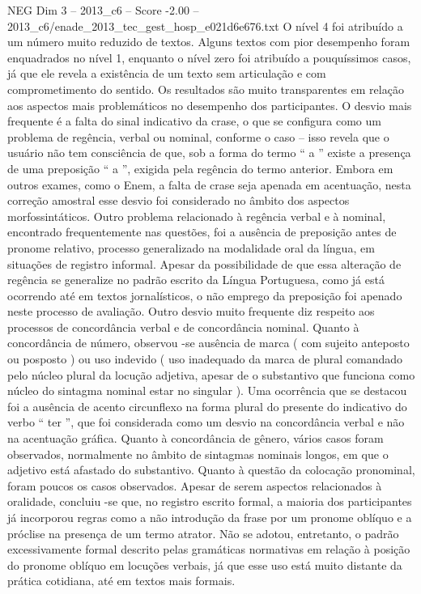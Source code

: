 \begin{textsample}{NEG Dim 3 – 2013\_c6 – Score -2.00 – 2013\_c6/enade\_2013\_tec\_gest\_hosp\_e021d6e676.txt}
O nível 4 foi atribuído a um número muito reduzido de textos.
Alguns textos com pior desempenho foram enquadrados no nível 1, enquanto o nível zero foi atribuído a pouquíssimos casos, já que ele revela a existência de um texto sem articulação e com comprometimento do sentido.
Os resultados são muito transparentes em relação aos aspectos mais problemáticos no desempenho dos participantes.
O desvio mais frequente é a falta do sinal indicativo da crase, o que se configura como um problema de regência, verbal ou nominal, conforme o caso – isso revela que o usuário não tem consciência de que, sob a forma do termo “ a ” existe a presença de uma preposição “ a ”, exigida pela regência do termo anterior.
Embora em outros exames, como o Enem, a falta de crase seja apenada em acentuação, nesta correção amostral esse desvio foi considerado no âmbito dos aspectos morfossintáticos.
Outro problema relacionado à regência verbal e à nominal, encontrado frequentemente nas questões, foi a ausência de preposição antes de pronome relativo, processo generalizado na modalidade oral da língua, em situações de registro informal.
Apesar da possibilidade de que essa alteração de regência se generalize no padrão escrito da Língua Portuguesa, como já está ocorrendo até em textos jornalísticos, o não emprego da preposição foi apenado neste processo de avaliação.
Outro desvio muito frequente diz respeito aos processos de concordância verbal e de concordância nominal.
Quanto à concordância de número, observou -se ausência de marca ( com sujeito anteposto ou posposto ) ou uso indevido ( uso inadequado da marca de plural comandado pelo núcleo plural da locução adjetiva, apesar de o substantivo que funciona como núcleo do sintagma nominal estar no singular ).
Uma ocorrência que se destacou foi a ausência de acento circunflexo na forma plural do presente do indicativo do verbo “ ter ”, que foi considerada como um desvio na concordância verbal e não na acentuação gráfica.
Quanto à concordância de gênero, vários casos foram observados, normalmente no âmbito de sintagmas nominais longos, em que o adjetivo está afastado do substantivo.
Quanto à questão da colocação pronominal, foram poucos os casos observados.
Apesar de serem aspectos relacionados à oralidade, concluiu -se que, no registro escrito formal, a maioria dos participantes já incorporou regras como a não introdução da frase por um pronome oblíquo e a próclise na presença de um termo atrator.
Não se adotou, entretanto, o padrão excessivamente formal descrito pelas gramáticas normativas em relação à posição do pronome oblíquo em locuções verbais, já que esse uso está muito distante da prática cotidiana, até em textos mais formais.

\end{textsample}
